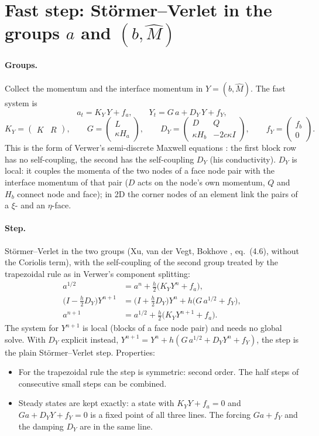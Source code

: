 \documentclass[11pt,a4paper]{article}
\begin{document}
\section{Fast step: Störmer--Verlet in the groups $a$ and $(b,\hat M)$}
\paragraph{Groups.} Collect the momentum and the interface momentum in $Y=(b,\hat M)$. The fast system is
\begin{equation}
a_t=K_Y\,Y+f_a,\qquad Y_t=G\,a+D_Y\,Y+f_Y,\label{eq:groups}
\end{equation}
\[
K_Y=\begin{pmatrix}K&R\end{pmatrix},\qquad G=\begin{pmatrix}L\\\kappa H_a\end{pmatrix},\qquad
D_Y=\begin{pmatrix}D&Q\\\kappa H_b&-2c\kappa I\end{pmatrix},\qquad f_Y=\begin{pmatrix}f_b\\0\end{pmatrix}.
\]
This is the form of Verwer's semi-discrete Maxwell equations \cite{verwer}: the first block row has no self-coupling, the
second has the self-coupling $D_Y$ (his conductivity). $D_Y$ is local: it couples the momenta of the two nodes of a face node pair
with the interface momentum of that pair ($D$ acts on the node's own momentum, $Q$ and $H_b$ connect node and face); in 2D the
corner nodes of an element link the pairs of a $\xi$- and an $\eta$-face.

\paragraph{Step.} Störmer--Verlet in the two groups (Xu, van der Vegt, Bokhove \cite{xvb}, eq.~(4.6), without the Coriolis term),
with the self-coupling of the second group treated by the trapezoidal rule as in Verwer's component splitting:
\begin{align}
a^{1/2}&=a^n+\tfrac h2\big(K_YY^n+f_a\big),\nonumber\\
\big(I-\tfrac h2D_Y\big)Y^{n+1}&=\big(I+\tfrac h2D_Y\big)Y^n+h\big(G\,a^{1/2}+f_Y\big),\label{eq:sv}\\
a^{n+1}&=a^{1/2}+\tfrac h2\big(K_YY^{n+1}+f_a\big).\nonumber
\end{align}
The system for $Y^{n+1}$ is local (blocks of a face node pair) and needs no global solve. With $D_Y$ explicit instead,
$Y^{n+1}=Y^n+h(G\,a^{1/2}+D_YY^n+f_Y)$, the step is the plain Störmer--Verlet step. Properties:
\begin{itemize}
\item For the trapezoidal rule the step is symmetric: second order. The half steps of consecutive small steps can be combined.
\item Steady states are kept exactly: a state with $K_YY+f_a=0$ and $Ga+D_YY+f_Y=0$ is a fixed point of all three lines. The forcing
  $Ga+f_Y$ and the damping $D_Y$ are in the same line.
\end{itemize}
\end{document}
